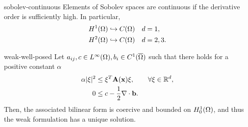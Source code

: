 \begin{Corollary}{sobolev-continuous}
  Elements of Sobolev spaces are continuous if the derivative
  order is sufficiently high. In particular,
  \begin{gather}
    \begin{aligned}
      H^1(\Omega) & \hookrightarrow C(\Omega) & d&= 1, \\
      H^2(\Omega) & \hookrightarrow C(\Omega) & d&= 2,3.
    \end{aligned}
  \end{gather}
\end{Corollary}

\begin{Lemma}{weak-well-posed}
  Let $a_{ij},c\in L^\infty(\Omega), b_i\in C^1(\overline{\Omega})$ such
  that there holds for a positive constant $\alpha$
  \begin{gather}
    \label{eq:hilbert:elliptic}
    \begin{split}
    \alpha\lvert\xi\rvert^2 &\le \xi^T \mathbf A(\mathbf x) \xi,
    \qquad \forall \xi \in \mathbb R^d,
    \\
    0 &\le c - \frac12 \nabla\cdot \mathbf b.
    \end{split}
  \end{gather}
  Then, the associated bilinear form is coercive and bounded on
  $H^1_0(\Omega)$, and thus the weak formulation has a unique
  solution.
\end{Lemma}

